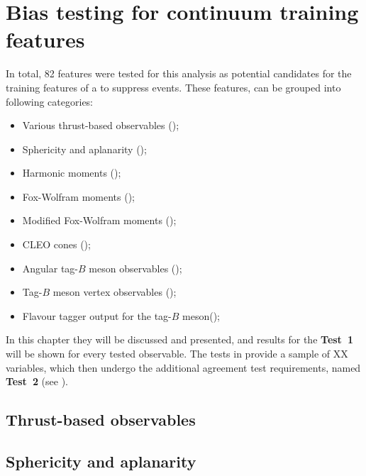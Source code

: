 \chapter{Bias testing for continuum \texorpdfstring{\BDT}{BDT} training features}\label{sec:appendix_continuum_features}

In total, 82 features were tested for this analysis as potential candidates for the training features of a \BDT to suppress \epem\ra\qqbar events.
These features, can be grouped into following categories:

\begin{itemize}
    \item Various thrust-based observables ();
    \item Sphericity and aplanarity ();
    \item Harmonic moments ();
    \item Fox-Wolfram moments ();
    \item Modified Fox-Wolfram moments ();
    \item CLEO cones ();
    \item Angular tag-$B$ meson observables ();
    \item Tag-$B$ meson vertex observables ();
    \item Flavour tagger output for the tag-$B$ meson();
\end{itemize}

In this chapter they will be discussed and presented, and results for the \textbf{Test~1} will be shown for every tested observable.
The tests in 
provide a sample of XX variables, which then undergo the additional agreement test requirements, named \textbf{Test~2} (see ).


\section{Thrust-based observables}\label{sec:thrusts}

\newpage

\section{Sphericity and aplanarity}\label{sec:sphericity_aplanarity}

\newpage

